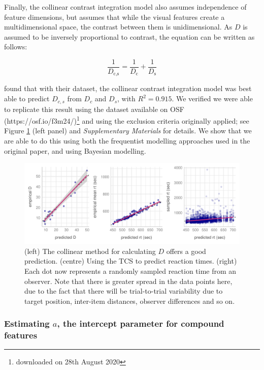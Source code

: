 \documentclass[preprint,12pt,authoryear]{elsarticle}
\begin{document}
Finally, the collinear contrast integration model also assumes independence of feature dimensions, but assumes that while the visual features create a multidimensional space, the contrast between them is unidimensional. As $D$ is assumed to be inversely proportional to contrast, the equation can be written as follows:

\begin{equation}
\frac{1}{D_\text{c,s}} = \frac{1}{D_\text{c}} + \frac{1}{D_\text{s}}
\label{eq:collinearcontrast}
\end{equation}

\cite{buetti2019predicting} found that with their dataset, the collinear contrast integration model was best able to predict $D_{c,s}$ from $D_c$ and $D_s$, with $R^2 = 0.915$. We verified we were able to replicate this result using the dataset available on OSF (https://osf.io/f3m24/)\footnote{downloaded on 28th August 2020} and using the exclusion criteria originally applied; see Figure \ref{fig:comp_rep} (left panel) and \textit{Supplementary Materials} for details. We show that we are able to do this using both the frequentist modelling approaches used in the original paper, and using Bayesian modelling.

\begin{figure}
\centering
\includegraphics[width=\textwidth]{../plots/computational_replication.pdf}
\caption{(left) The collinear method for calculating $D$ offers a good prediction. (centre) Using the TCS to predict reaction times. (right) Each dot now represents a randomly sampled reaction time from an observer. Note that there is greater spread in the data points here, due to the fact that there will be trial-to-trial variability due to target position, inter-item distances, observer differences and so on.}
\label{fig:comp_rep}
\end{figure}

\subsubsection{Estimating $a$, the intercept parameter for compound features}
\end{document}
